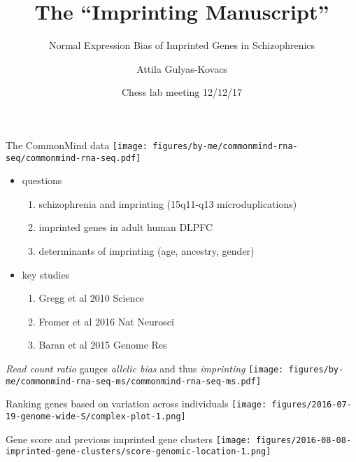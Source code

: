 \documentclass{beamer}
\title{The ``Imprinting Manuscript''}
\subtitle{Normal Expression Bias of Imprinted Genes in Schizophrenics}
\author{Attila Gulyas-Kovacs}
\date{Chess lab meeting 12/12/17}
\begin{document}
\maketitle

\begin{frame}[label=cmc]{The CommonMind data}
\texttt{[image: figures/by-me/commonmind-rna-seq/commonmind-rna-seq.pdf]}
\end{frame}

\begin{frame}
\begin{itemize}
\item questions
\begin{enumerate}
\item schizophrenia and imprinting (15q11-q13 microduplications)
\item imprinted genes in adult human DLPFC
\item determinants of imprinting (age, ancestry, gender)
\end{enumerate}
\item key studies
\begin{enumerate}
\item Gregg et al 2010 Science
\item Fromer et al 2016 Nat Neurosci
\item Baran et al 2015 Genome Res
\end{enumerate}
\end{itemize}
\end{frame}

\begin{frame}{\emph{Read count ratio} gauges \emph{allelic bias} and thus \emph{imprinting}}
\texttt{[image: figures/by-me/commonmind-rna-seq-ms/commonmind-rna-seq-ms.pdf]}
\end{frame}

\begin{frame}{Ranking genes based on variation across individuals}
\texttt{[image: figures/2016-07-19-genome-wide-S/complex-plot-1.png]}
\end{frame}

\begin{frame}{Gene score and previous imprinted gene clusters}
\texttt{[image: figures/2016-08-08-imprinted-gene-clusters/score-genomic-location-1.png]}
\end{frame}
\end{document}
